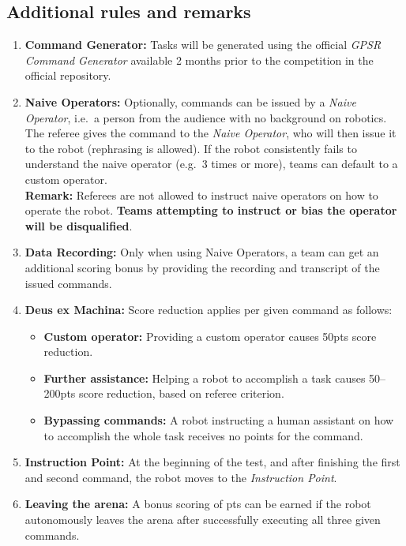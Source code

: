 %
%
\subsection*{Additional rules and remarks}
\begin{enumerate}[nosep]
	\item \textbf{Command Generator:} Tasks will be generated using the official \emph{GPSR Command Generator} available 2 months prior to the competition in the official repository.

	\item \textbf{Naive Operators:} Optionally, commands can be issued by a \emph{Naive Operator}, i.e.~a person from the audience with no background on robotics. The referee gives the command to the \emph{Naive Operator}, who will then issue it to the robot (rephrasing is allowed). If the robot consistently fails to understand the naive operator (e.g.~3 times or more), teams can default to a custom operator.
	\\[2mm]\textbf{Remark:} Referees are not allowed to instruct naive operators on how to operate the robot. \textbf{Teams attempting to instruct or bias the operator will be disqualified}.\\[2mm]

	\item \textbf{Data Recording:} Only when using Naive Operators, a team can get an additional scoring bonus by providing the recording and transcript of the issued commands.

	\item \textbf{Deus ex Machina:} Score reduction applies per given command as follows:
	\begin{itemize}[nosep]
	\item \textbf{Custom operator:} Providing a custom operator causes 50pts score reduction.
	\item \textbf{Further assistance:} Helping a robot to accomplish a task causes 50--200pts score reduction, based on referee criterion.
	\item \textbf{Bypassing commands:} A robot instructing a human assistant on how to accomplish the whole task receives no points for the command.
	\end{itemize}

	\item \textbf{Instruction Point:} At the beginning of the test, and after finishing the first and second command, the robot moves to the \textit{Instruction Point}.

	\item \textbf{Leaving the arena:} A bonus scoring of pts can be earned if the robot autonomously leaves the arena after successfully executing all three given commands.
\end{enumerate}

